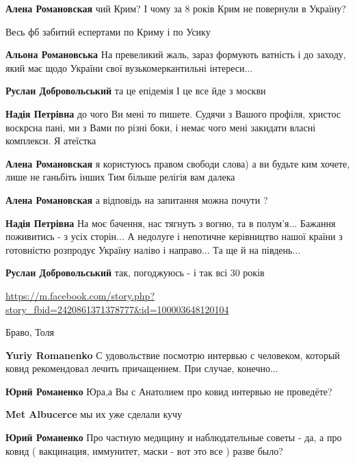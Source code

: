 \begin{itemize}
\begin{itemize}
\textbf{Алена Романовская} чий Крим? І чому за 8 років Крим не повернули в Україну?

Весь фб забитий еспертами по Криму і по Усику

\textbf{Альона Романовська}
На превеликий жаль, зараз формують ватність і до заходу, який має щодо України свої вузькомеркантильні інтереси...

\textbf{Руслан Добровольський} та це епідемія
І це все йде з москви

\textbf{Надія Петрівна} до чого Ви мені то пишете. Судячи з Вашого профіля, христос воскрсна пані, ми з Вами по різні боки, і немає чого мені закидати власні комплекси. Я атеїстка

\textbf{Алена Романовская} я користуюсь правом свободи слова) а ви будьте ким хочете, лише не ганьбіть інших
Тим більше релігія вам далека

\textbf{Алена Романовская} а відповідь на запитання можна почути ?

\textbf{Надія Петрівна}
На моє бачення, нас тягнуть з вогню, та в полум'я...
Бажання поживитись - з усіх сторін...
А недолуге і непотичне керівництво нашої країни з готовністю розпродує Україну наліво і направо...
Та ще й на південь...

\textbf{Руслан Добровольський} так, погоджуюсь - і так всі 30 років

\url{https://m.facebook.com/story.php?story_fbid=2420861371378777&id=100003648120104}

\end{itemize} %


Браво, Толя

\begin{itemize} %
\textbf{Yuriy Romanenko} С удовольствие посмотрю интервью с человеком, который ковид рекомендовал лечить причащением.
При случае, конечно...

\textbf{Юрий Романенко} Юра,а Вы с Анатолием про ковид интервью не проведёте?


\textbf{Met Albucerce} мы их уже сделали кучу

\textbf{Юрий Романенко} Про частную медицину и наблюдательные советы - да, а про
ковид ( вакцинация, иммунитет, маски - вот это все ) разве было?
\end{itemize} %


\end{itemize}
